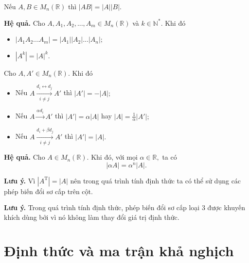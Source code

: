 \begin{mybox}
\begin{theorem}
Nếu $A, B  \in M_n \left( {\mathbb{R}} \right)$ thì $\left| {AB} \right| = \left| A \right|\left| B \right|.$
\end{theorem}
\end{mybox}
\textbf{Hệ quả.} Cho $A, A_1, A_2, ..., A_m  \in M_n \left( {\mathbb{R}} \right)$ và $k \in {\mathbb{N}^ * }.$ Khi đó
\begin{itemize}
\item $\left| {{A_1}{A_2}...{A_m}} \right| = \left| {{A_1}} \right|\left| {{A_2}} \right|...\left| {{A_n}} \right|;$
\item $\left| {{A^k}} \right| = {\left| A \right|^k}.$
\end{itemize}
\begin{mybox}
\begin{theorem}
Cho $A, A'  \in M_n \left( {\mathbb{R}} \right).$ Khi đó
\begin{itemize}
\item Nếu $A\mathop  \to \limits_{i \ne j}^{{d_i} \leftrightarrow {d_j}} A'$ thì $\left| {A'} \right| =  - \left| A \right|;$
\item Nếu $A\mathop  \to \limits^{\alpha {d_i}} A'$ thì $\left| {A'} \right| = \alpha \left| A \right|$ hay $\left| A \right| = \frac{1}{\alpha }\left| {A'} \right|;$
\item Nếu $A\mathop  \to \limits_{i \ne j}^{{d_i} + \beta {d_j}} A'$ thì $\left| {A'} \right| = \left| A \right|.$
\end{itemize}
\end{theorem}
\end{mybox}
\textbf{Hệ quả.} Cho $A  \in M_n \left( {\mathbb{R}} \right).$ Khi đó, với mọi $\alpha \in \mathbb{R},$ ta có
$$\left| {\alpha A} \right| = {\alpha ^n}\left| A \right|.$$
\begin{mybox}
\textbf{Lưu ý.} Vì $\left| {{A^{\mathrm{T}}}} \right| = \left| A \right|$ nên trong quá trình tính định thức ta có thể sử dụng các phép biến đổi sơ cấp trên cột. 
\end{mybox}
\begin{mybox}
\textbf{Lưu ý.} Trong quá trình tính định thức, phép biến đổi sơ cấp loại 3 được khuyến khích dùng bởi vì nó không làm thay đổi giá trị định thức.
\end{mybox}
\section{Định thức và ma trận khả nghịch}
